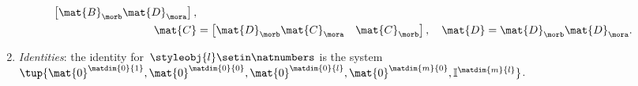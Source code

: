 \begin{ctdefinition}
\begin{enumerate}
\begin{equation}
\begin{aligned}
\begin{bmatrix}
                                  \mat{B}_\morb\mat{D}_\mora
                              \end{bmatrix}, \\
                      \mat{C}  & =\begin{bmatrix}
                                      \mat{D}_\morb\mat{C}_\mora & \mat{C}_\morb
                                  \end{bmatrix}, \quad
                      \mat{D}=\mat{D}_\morb\mat{D}_\mora.
                  \end{aligned}
              \end{equation}
        \item \emph{Identities}: the identity for~$\styleobj{l}\setin \natnumbers$ is the system~$\tup{\mat{0}^{\matdim{0}{1}},\mat{0}^{\matdim{0}{0}},\mat{0}^{\matdim{0}{l}},\mat{0}^{\matdim{m}{0}},\mathbb{I}^{\matdim{m}{l}}}$.
    \end{enumerate}
\end{ctdefinition}

